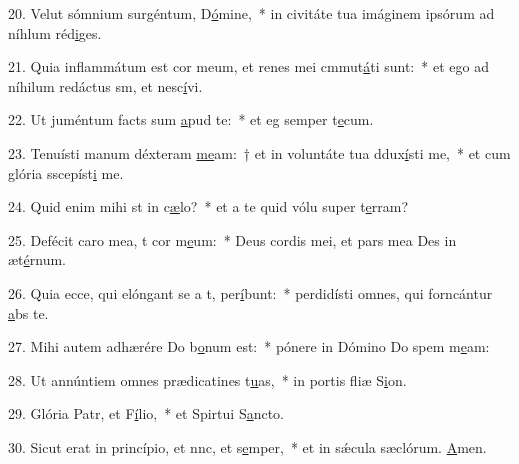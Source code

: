 20. Velut sómnium surgéntum, D\uline{ó}mine,~* in civitáte tua imáginem ipsórum ad níhlum réd\uline{i}ges.\par 
21. Quia inflammátum est cor meum, et renes mei cmmut\uline{á}ti sunt:~* et ego ad níhilum redáctus sm, et nesc\uline{í}vi.\par 
22. Ut juméntum facts sum \uline{a}pud te:~* et eg semper t\uline{e}cum.\par 
23. Tenuísti manum déxteram \uline{me}am:~† et in voluntáte tua ddux\uline{í}sti me,~* et cum glória sscepíst\uline{i} me.\par 
24. Quid enim mihi st in c\uline{æ}lo?~* et a te quid vólu super t\uline{e}rram?\par 
25. Defécit caro mea, t cor m\uline{e}um:~* Deus cordis mei, et pars mea Des in æt\uline{é}rnum.\par 
26. Quia ecce, qui elóngant se a t, per\uline{í}bunt:~* perdidísti omnes, qui forncántur \uline{a}bs te.\par 
27. Mihi autem adhærére Do b\uline{o}num est:~* pónere in Dómino Do spem m\uline{e}am:\par 
28. Ut annúntiem omnes prædicatines t\uline{u}as,~* in portis fliæ S\uline{i}on.\par 
29. Glória Patr, et F\uline{í}lio,~* et Spirtui S\uline{a}ncto.\par 
30. Sicut erat in princípio, et nnc, et s\uline{e}mper,~* et in sǽcula sæclórum. \uline{A}men.\par 

